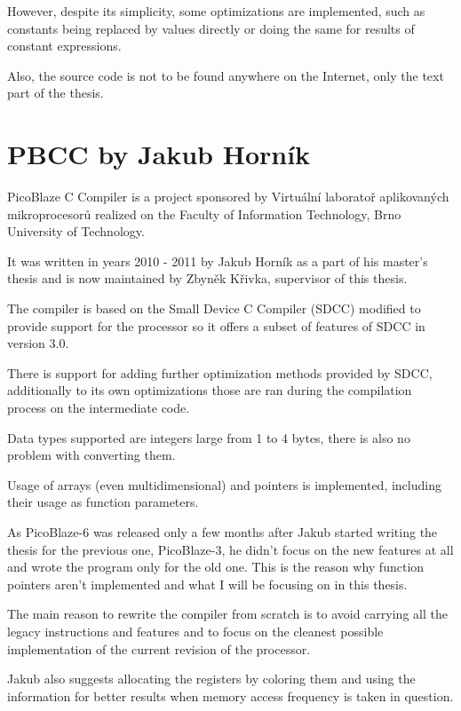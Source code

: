     However, despite its simplicity, some optimizations are implemented, 
    such as constants being replaced by values directly or 
    doing the same for results of constant expressions.
    
    Also, the source code is not to be found anywhere on the Internet, only the text part of the thesis.
    

    \section{PBCC by Jakub Horník}\label{prev_pbcc}


    PicoBlaze C Compiler is a project sponsored by Virtuální laboratoř aplikovaných mikroprocesorů %
    realized on the Faculty of Information Technology, Brno University of Technology.

    It was written in years 2010 - 2011 by Jakub Horník as a part of his master's thesis and is now maintained by Zbyněk Křivka, supervisor of this thesis.

    The compiler is based on the Small Device C Compiler (SDCC) modified to provide support for the processor so it offers a subset of features of SDCC in version 3.0.

    There is support for adding further optimization methods provided by SDCC, additionally to its own optimizations those are ran during the compilation process on the intermediate code.

    Data types supported are integers large from 1 to 4 bytes, there is also no problem with converting them.

    Usage of arrays (even multidimensional) and pointers is implemented, including their usage as function parameters.

    As PicoBlaze-6 was released only a few months after Jakub started writing the thesis for the previous one, PicoBlaze-3, he didn't focus on the new features at all and wrote the program only for the old one. This is the reason why function pointers aren't implemented and what I will be focusing on in this thesis.

    The main reason to rewrite the compiler from scratch is to avoid carrying all the legacy instructions and features and to focus on the cleanest possible implementation of the current revision of the processor.

    Jakub also suggests allocating the registers by coloring them and using the information for better results when memory access frequency is taken in question.

